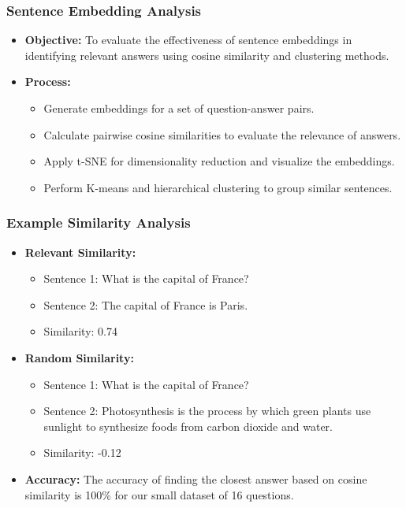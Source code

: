 \documentclass{beamer}
\begin{document}
\begin{frame}
\frametitle{Sentence Embedding Analysis}
\begin{itemize}
    \item \textbf{Objective:} To evaluate the effectiveness of sentence embeddings in identifying relevant answers using cosine similarity and clustering methods.
    \item \textbf{Process:}
    \begin{itemize}
        \item Generate embeddings for a set of question-answer pairs.
        \item Calculate pairwise cosine similarities to evaluate the relevance of answers.
        \item Apply t-SNE for dimensionality reduction and visualize the embeddings.
        \item Perform K-means and hierarchical clustering to group similar sentences.
    \end{itemize}
\end{itemize}
\end{frame}

\begin{frame}
\frametitle{Example Similarity Analysis}
\begin{itemize}
    \item \textbf{Relevant Similarity:}
    \begin{itemize}
        \item Sentence 1: What is the capital of France?
        \item Sentence 2: The capital of France is Paris.
        \item Similarity: 0.74
    \end{itemize}
    \item \textbf{Random Similarity:}
    \begin{itemize}
        \item Sentence 1: What is the capital of France?
        \item Sentence 2: Photosynthesis is the process by which green plants use sunlight to synthesize foods from carbon dioxide and water.
        \item Similarity: -0.12
    \end{itemize}
    \item \textbf{Accuracy:} The accuracy of finding the closest answer based on cosine similarity is 100\% for our small dataset of 16 questions.
\end{itemize}
\end{frame}
\end{document}
